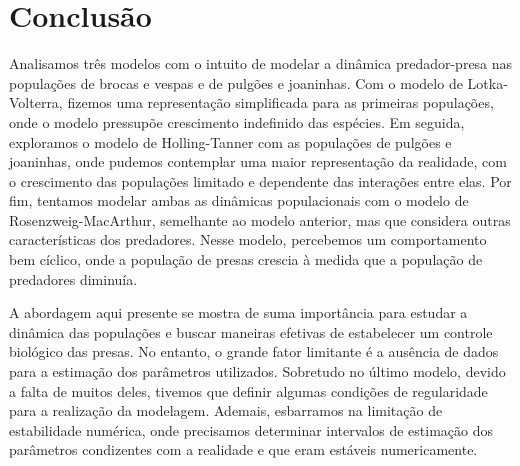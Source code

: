 \section{Conclusão}

Analisamos três modelos com o intuito de modelar a dinâmica predador-presa nas populações de brocas e vespas e de pulgões e joaninhas. Com o modelo de Lotka-Volterra, fizemos uma representação simplificada para as primeiras populações, onde o modelo pressupõe crescimento indefinido das espécies. Em seguida, exploramos o modelo de Holling-Tanner com as populações de pulgões e joaninhas, onde pudemos contemplar uma maior representação da realidade, com o crescimento das populações limitado e dependente das interações entre elas. Por fim, tentamos modelar ambas as dinâmicas populacionais com o modelo de Rosenzweig-MacArthur, semelhante ao modelo anterior, mas que considera outras características dos predadores. Nesse modelo, percebemos um comportamento bem cíclico, onde a população de presas crescia à medida que a população de predadores diminuía.

A abordagem aqui presente se mostra de suma importância para estudar a dinâmica das populações e buscar maneiras efetivas de estabelecer um controle biológico das presas. No entanto, o grande fator limitante é a ausência de dados para a estimação dos parâmetros utilizados. Sobretudo no último modelo, devido a falta de muitos deles, tivemos que definir algumas condições de regularidade para a realização da modelagem. Ademais, esbarramos na limitação de estabilidade numérica, onde precisamos determinar intervalos de estimação dos parâmetros condizentes com a realidade e que eram estáveis numericamente.
